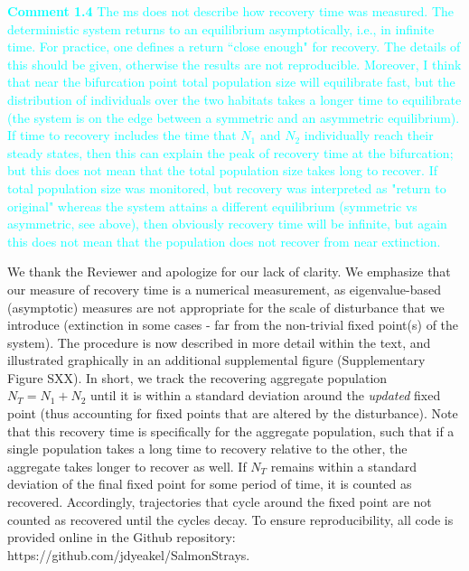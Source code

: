 \documentclass[ucm,12pt]{ucletter}
\newcounter{section}
\begin{document}
\begin{letter}


\noindent \textcolor{cyan}{
{\bf Comment 1.4} The ms does not describe how recovery time was measured. The deterministic system returns to an equilibrium asymptotically, i.e., in infinite time. For practice, one defines a return ``close enough" for recovery. The details of this should be given, otherwise the results are not reproducible. Moreover, I think that near the bifurcation point total population size will equilibrate fast, but the distribution of individuals over the two habitats takes a longer time to equilibrate (the system is on the edge between a symmetric and an asymmetric equilibrium). If time to recovery includes the time that $N_1$ and $N_2$ individually reach their steady states, then this can explain the peak of recovery time at the bifurcation; but this does not mean that the total population size takes long to recover. If total population size was monitored, but recovery was interpreted as "return to original" whereas the system attains a different equilibrium (symmetric vs asymmetric, see above), then obviously recovery time will be infinite, but again this does not mean that the population does not recover from near extinction.
}

 We thank the Reviewer and apologize for our lack of clarity. We emphasize that our measure of recovery time is a numerical measurement, as eigenvalue-based (asymptotic) measures are not appropriate for the scale of disturbance that we introduce (extinction in some cases - far from the non-trivial fixed point(s) of the system). The procedure is now described in more detail within the text, and illustrated graphically in an additional supplemental figure (Supplementary Figure SXX). In short, we track the recovering aggregate population $N_T=N_1+N_2$ until it is within a standard deviation around the \emph{updated} fixed point (thus accounting for fixed points that are altered by the disturbance). Note that this recovery time is specifically for the aggregate population, such that if a single population takes a long time to recovery relative to the other, the aggregate takes longer to recover as well. If $N_T$ remains within a standard deviation of the final fixed point for some period of time, it is counted as recovered. Accordingly, trajectories that cycle around the fixed point are not counted as recovered until the cycles decay. To ensure reproducibility, all code is provided online in the Github repository: https://github.com/jdyeakel/SalmonStrays.


\end{letter}
\end{document}
